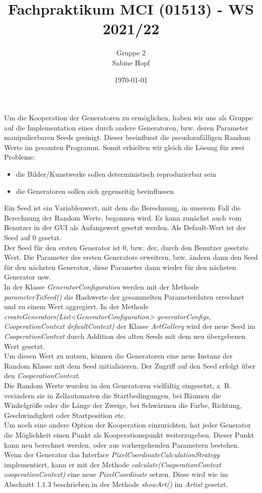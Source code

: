\documentclass[../mciAusarbeitung.tex]{subfiles}
\title{Fachpraktikum MCI (01513) - WS 2021/22}
\author{Gruppe 2\\
	Sabine Hopf}
\date{\today}
\begin{document}
	Um die Kooperation der Generatoren zu ermöglichen, haben wir uns als Gruppe auf die Implementation eines durch andere Generatoren, bzw. deren Parameter manipulierbaren Seeds geeinigt. Dieser beeinflusst die pseudozufälligen Random Werte im gesamten Programm. Somit erhielten wir gleich die Lösung für zwei Probleme: 
	\begin{itemize}
		\item die Bilder/Kunstwerke sollen deterministisch reproduzierbar sein
		\item die Generatoren sollen sich gegenseitig beeinflussen
	\end{itemize}
	Ein Seed ist ein Variablenwert, mit dem die Berechnung, in unserem Fall die Berechnung der Random Werte, begonnen wird. Er kann zunächst auch vom Benutzer in der GUI als Anfangswert gesetzt werden. Als Default-Wert ist der Seed auf 0 gesetzt.\\
	Der Seed für den ersten Generator ist 0, bzw. der, durch den Benutzer gesetzte Wert. Die Parameter des ersten Generators erweitern, bzw. ändern dann den Seed für den nächsten Generator, diese Parameter dann wieder für den nächsten Generator usw.\\ 
	In der Klasse \textit{GeneratorConfiguration} werden mit der Methode \textit{parameterToSeed()} die Hashwerte der gesammelten Parameterdaten errechnet und zu einem Wert aggregiert. In der Methode \textit{createGenerators(List<GeneratorConfiguration> generatorConfigs,
	CooperationContext defaultContext)} der Klasse \textit{ArtGallery} wird der neue Seed im \textit{CooperationContext} durch Addition des alten Seeds mit dem neu übergebenen Wert gesetzt.\\
	Um diesen Wert zu nutzen, können die Generatoren eine neue Instanz der Random Klasse mit dem Seed initialisieren. Der Zugriff auf den Seed erfolgt über den \textit{CooperationContext}.\\
	Die Random Werte wurden in den Generatoren vielfältig eingesetzt, z. B. verändern sie in Zellautomaten die Startbedingungen, bei Bäumen die Winkelgröße oder die Länge der Zweige, bei Schwärmen die Farbe, Richtung, Geschwindigkeit oder Startposition etc.\\
	Um noch eine andere Option der Kooperation einzurichten, hat jeder Generator die Möglichkeit einen Punkt als Kooperationspunkt weiterzugeben. Dieser Punkt kann neu berechnet werden, oder aus vorhergehenden Parametern bestehen.\\
	Wenn der Generator das Interface \textit{PixelCoordinateCalculationStrategy} implementiert, kann er mit der Methode \textit{calculate(CooperationContext cooperationContext)} eine neue \textit{PixelCoordinate} setzen. Diese wird wie im Abschnitt 1.1.3 beschrieben in der Methode \textit{showArt()} im \textit{Artist} gesetzt.\\
\end{document}
